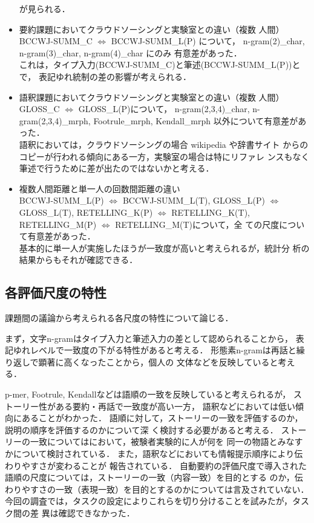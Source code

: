 \documentclass[japanese]{jnlp_1.4}
\newcommand{\modified}[1]{}
\begin{document}
\begin{itemize}
	が見られる．
  \item 要約課題においてクラウドソーシングと実験室との違い\modified{の評価}（複数
	人間） \\
	BCCWJ-SUMM\_C $\Leftrightarrow$ BCCWJ-SUMM\_L(P) について，
	n-gram(2)\_char, n-gram(3)\_char, n-gram(4)\_char にのみ
	有意差があった．\\
	これは，タイプ入力(BCCWJ-SUMM\_C)と筆述(BCCWJ-SUMM\_L(P))とで，
	表記ゆれ統制の差の影響が考えられる．
  \item 語釈課題においてクラウドソーシングと実験室との違い\modified{の評価}（複数
	人間） \\
	GLOSS\_C $\Leftrightarrow$ GLOSS\_L(P)について，
	n-gram(2,3,4)\_char,
	n-gram(2,3,4)\_mrph,
	Footrule\_mrph, Kendall\_mrph 以外について有意差があった．
	\\
	語釈においては，クラウドソーシングの場合 wikipedia や辞書サイト
	からのコピーが行われる傾向にある一方，実験室の場合は特にリファレ
	ンスもなく筆述で行うために差が出たのではないかと考える．
  \item 複数人間距離と単一人の回数間距離の違い\modified{の評価} \\
	BCCWJ-SUMM\_L(P) $\Leftrightarrow$ BCCWJ-SUMM\_L(T), 
	GLOSS\_L(P) $\Leftrightarrow$ GLOSS\_L(T),\linebreak
	RETELLING\_K(P) $\Leftrightarrow$ RETELLING\_K(T),
	RETELLING\_M(P) $\Leftrightarrow$ RETELLING\_M(T)について，全
	ての尺度について有意差があった．\\
	基本的に単一人が実施したほうが一致度が高いと考えられるが，統計分
	析の結果からもそれが確認できる．
 \end{itemize} 


\subsection{各評価尺度の特性}

課題間の議論から考えられる各尺度の特性について論じる．

まず，文字n-gramはタイプ入力と筆述入力の差として認められることから，
表記ゆれレベルで一致度の下がる特性があると考える．
形態素n-gramは再話と繰り返しで顕著に高くなったことから，個人の
文体などを反映していると考える．

p-mer, Footrule, Kendallなどは語順の一致を反映していると考えられるが，
ストーリー性がある要約・再話で一致度が高い一方，
語釈などにおいては低い傾向にあることがわかった．
語順に対して，ストーリーの一致を評価するのか，説明の順序を評価するのかについて深
く検討する必要があると考える．
ストーリーの一致については\cite{kato-jnlp-2016}において，被験者実験的に人が何を
同一の物語とみなすかについて検討されている．
また，語釈などにおいても情報提示順序により伝わりやすさが変わること\cite{kato-jcss-2015}が
報告されている．
自動要約の評価尺度で導入された語順の尺度については，ストーリーの一致（内容一致）を目的とする
のか，伝わりやすさの一致（表現一致）を目的とするのかについては言及されていない．
今回の調査では，タスクの設定によりこれらを切り分けることを試みたが，タスク間の差
異は確認できなかった．
\end{document}

